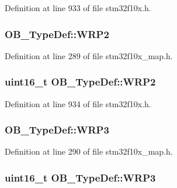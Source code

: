 Definition at line 933 of file stm32f10x.\+h.

\subsubsection[{\texorpdfstring{W\+R\+P2}{WRP2}}]{ O\+B\+\_\+\+Type\+Def\+::\+W\+R\+P2}\hypertarget{struct_o_b___type_def_ae4323b7c39aa9415cf6f419d97368fb3}{}\label{struct_o_b___type_def_ae4323b7c39aa9415cf6f419d97368fb3}


Definition at line 289 of file stm32f10x\+\_\+map.\+h.

\subsubsection[{\texorpdfstring{W\+R\+P2}{WRP2}}]{ {\bf uint16\+\_\+t} O\+B\+\_\+\+Type\+Def\+::\+W\+R\+P2}\hypertarget{struct_o_b___type_def_a475b2347222db8e35d7ade1a881ca31c}{}\label{struct_o_b___type_def_a475b2347222db8e35d7ade1a881ca31c}


Definition at line 934 of file stm32f10x.\+h.

\subsubsection[{\texorpdfstring{W\+R\+P3}{WRP3}}]{ O\+B\+\_\+\+Type\+Def\+::\+W\+R\+P3}\hypertarget{struct_o_b___type_def_aaab1725e4b82d905feaa6e150e391cf8}{}\label{struct_o_b___type_def_aaab1725e4b82d905feaa6e150e391cf8}


Definition at line 290 of file stm32f10x\+\_\+map.\+h.

\subsubsection[{\texorpdfstring{W\+R\+P3}{WRP3}}]{ {\bf uint16\+\_\+t} O\+B\+\_\+\+Type\+Def\+::\+W\+R\+P3}\hypertarget{struct_o_b___type_def_ab8bdaebc42e051ff9911eb88dad75f92}{}\label{struct_o_b___type_def_ab8bdaebc42e051ff9911eb88dad75f92}


